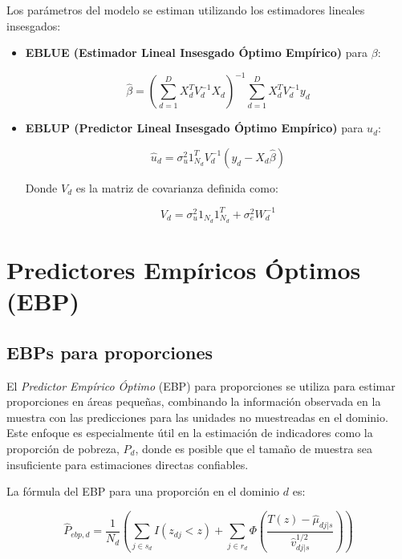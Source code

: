 \documentclass[12pt,spanish]{article}
\begin{document}
Los parámetros del modelo se estiman utilizando los estimadores lineales insesgados:
\begin{itemize}
    \item \textbf{EBLUE (Estimador Lineal Insesgado Óptimo Empírico)} para $\beta$:
    
    \[
    \hat{\beta} = \left( \sum_{d=1}^{D} X_d^T V_d^{-1} X_d \right)^{-1} \sum_{d=1}^{D} X_d^T V_d^{-1} y_d
    \]

    \item \textbf{EBLUP (Predictor Lineal Insesgado Óptimo Empírico)} para $u_d$:
    
    \[
    \hat{u}_d = \sigma_u^2 1_{N_d}^T V_d^{-1} (y_d - X_d \hat{\beta})
    \]

    Donde $V_d$ es la matriz de covarianza definida como:
    
    \[
    V_d = \sigma_u^2 1_{N_d} 1_{N_d}^T + \sigma_e^2 W_d^{-1}
    \]
\end{itemize}

\section*{Predictores Empíricos Óptimos (EBP)}

\subsection*{EBPs para proporciones}

El \textit{Predictor Empírico Óptimo} (EBP) para proporciones se utiliza para estimar proporciones en áreas pequeñas, combinando la información observada en la muestra con las predicciones para las unidades no muestreadas en el dominio. Este enfoque es especialmente útil en la estimación de indicadores como la proporción de pobreza, $P_d$, donde es posible que el tamaño de muestra sea insuficiente para estimaciones directas confiables.

La fórmula del EBP para una proporción en el dominio $d$ es:

\[
\hat{P}_{ebp,d} = \frac{1}{N_d} \left( \sum_{j \in s_d} I(z_{dj} < z) + \sum_{j \in r_d} \Phi \left( \frac{T(z) - \hat{\mu}_{dj | s}}{\hat{v}_{dj | s}^{1/2}} \right) \right)
\]
\end{document}
